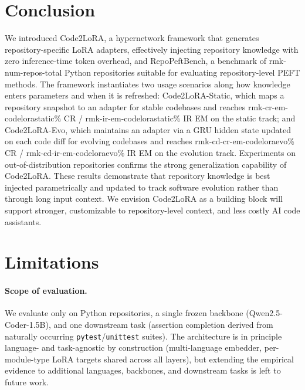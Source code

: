 \documentclass{llmxive}
\providecommand{\UseMacro}[1]{\csname rmk-#1\endcsname}
\providecommand{\codelora}{Code2LoRA\xspace}
\providecommand{\repopeftbench}{RepoPeftBench\xspace}
\providecommand{\codelorastatic}{\codelora-Static\xspace}
\providecommand{\codeloraevo}{\codelora-Evo\xspace}
\begin{document}
\section{Conclusion}
\label{sec:conclusion}

We introduced \codelora{}, a hypernetwork framework that generates repository-specific LoRA adapters, effectively injecting repository knowledge with zero inference-time token overhead,
and \repopeftbench{}, a benchmark of \UseMacro{num-repos-total} Python repositories suitable for evaluating repository-level PEFT methods.
The framework instantiates two usage scenarios along how knowledge enters parameters and when it is refreshed: \codelorastatic{}, which maps a repository snapshot to an adapter for stable codebases and reaches \UseMacro{cr-em-codelorastatic}\% CR / \UseMacro{ir-em-codelorastatic}\% IR EM on the static track;
and \codeloraevo{}, which maintains an adapter via a GRU hidden state updated on each code diff for evolving codebases and reaches \UseMacro{cd-cr-em-codeloraevo}\% CR / \UseMacro{cd-ir-em-codeloraevo}\% IR EM on the evolution track.
Experiments on out-of-distribution repositories confirms the strong generalization capability of \codelora{}.
These results demonstrate that repository knowledge is best injected parametrically and updated to track software evolution rather than through long input context.
We envision \codelora{} as a building block will support stronger, customizable to repository-level context, and less costly AI code assistants.





\section*{Limitations}

\paragraph{Scope of evaluation.}
We evaluate only on Python repositories, a single frozen backbone (Qwen2.5-Coder-1.5B), and one downstream task (assertion completion derived from naturally occurring \texttt{pytest}/\texttt{unittest} suites).
The architecture is in principle language- and task-agnostic by construction (multi-language embedder, per-module-type LoRA targets shared across all layers), but extending the empirical evidence to additional languages, backbones, and downstream tasks is left to future work.
\end{document}
